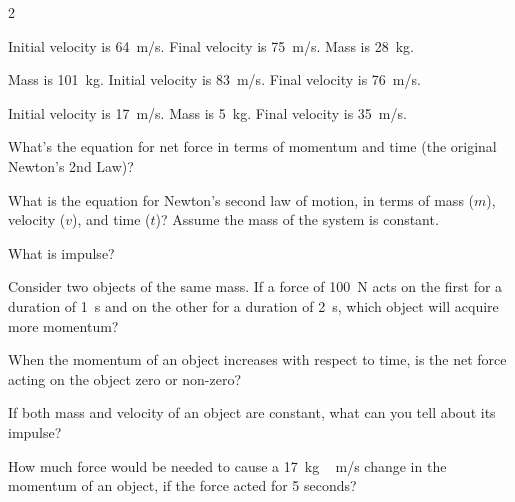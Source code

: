 \documentclass{article}
\numberwithin{equation}{section}
\numberwithin{figure}{section}
\begin{document}
\begin{multicols}{2}
\begin{exercise} \label{MqRZuz}
     Initial velocity is \SI{64}{m/s}. Final velocity is \SI{75}{m/s}. Mass is \SI{28}{kg}.
\end{exercise}

\begin{exercise} \label{qSPMmV}
    Mass is \SI{101}{kg}. Initial velocity is \SI{83}{m/s}. Final velocity is \SI{76}{m/s}. 
\end{exercise}

\begin{exercise} \label{4phY3A}
    Initial velocity is \SI{17}{m/s}. Mass is \SI{5}{kg}. Final velocity is \SI{35}{m/s}. 
\end{exercise}

\cyanhrule

\begin{exercise}
    What's the equation for net force in terms of momentum and time (the original Newton's 2nd Law)?
\end{exercise}

\begin{exercise} \label{9CaNPq}
    What is the equation for Newton's second law of motion, in terms of mass ($m$), velocity ($v$), and time ($t$)? Assume the mass of the system is constant.
\end{exercise}

\begin{exercise}
    What is impulse?
\end{exercise}

\begin{exercise} \label{6HJcp6}
    Consider two objects of the same mass. If a force of \SI{100}{N}  acts on the first for a duration of \SI{1}{s}  and on the other for a duration of \SI{2}{s}, which object will acquire more momentum?
\end{exercise}

\begin{exercise}
    When the momentum of an object increases with respect to time, is the net force acting on the object zero or non-zero?
\end{exercise}

\begin{exercise} \label{ukvCcg}
    If both mass and velocity of an object are constant, what can you tell about its impulse?
\end{exercise}

\begin{exercise} \label{dAVKAB}
    How much force would be needed to cause a \SI{17}{kg\,m/s} change in the momentum of an object, if the force acted for 5 seconds?
\end{exercise}


\end{multicols}
\end{document}
